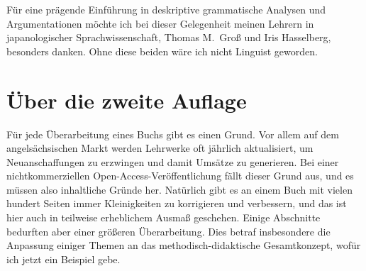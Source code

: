 Für eine prägende Einführung in deskriptive grammatische Analysen und Argumentationen möchte ich bei dieser Gelegenheit meinen Lehrern in japanologischer Sprachwissenschaft, Thomas M.\ Groß und Iris Hasselberg, besonders danken.
Ohne diese beiden wäre ich nicht Linguist geworden.


\section*{Über die zweite Auflage}
\label{sec:ueberdiezweiteauflage}

Für jede Überarbeitung eines Buchs gibt es einen Grund.
Vor allem auf dem angelsächsischen Markt werden Lehrwerke oft jährlich aktualisiert, um Neuanschaffungen zu erzwingen und damit Umsätze zu generieren.
Bei einer nichtkommerziellen Open-Access-Veröffentlichung fällt dieser Grund aus, und es müssen also inhaltliche Gründe her.
Natürlich gibt es an einem Buch mit vielen hundert Seiten immer Kleinigkeiten zu korrigieren und verbessern, und das ist hier auch in teilweise erheblichem Ausmaß geschehen.
Einige Abschnitte bedurften aber einer größeren Überarbeitung.
Dies betraf insbesondere die Anpassung einiger Themen an das methodisch-didaktische Gesamtkonzept, wofür ich jetzt ein Beispiel gebe.

